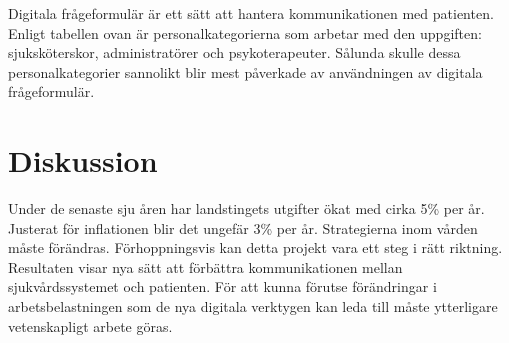 \documentclass[12pt,a4paper,oneside]{article}
\let\oldcite\cite
\renewcommand*\cite[1]{\textsuperscript{\oldcite{#1}}}
\begin{document}
\newpage
Digitala fr{\aa}geformul{\"a}r {\"a}r ett s{\"a}tt att hantera kommunikationen med patienten. Enligt tabellen ovan {\"a}r personalkategorierna som arbetar med den uppgiften: sjuksk{\"o}terskor, administrat{\"o}rer och psykoterapeuter. S{\aa}lunda skulle dessa personalkategorier sannolikt blir mest p{\aa}verkade av anv{\"a}ndningen av digitala fr{\aa}geformul{\"a}r.


\section*{Diskussion}
Under de senaste sju {\aa}ren har landstingets utgifter {\"o}kat med cirka 5\% per {\aa}r. Justerat f{\"o}r inflationen blir det ungef{\"a}r 3\% per {\aa}r\cite{numbers3.1, numbers3.2}. Strategierna inom v{\aa}rden m{\aa}ste f{\"o}r{\"a}ndras. F{\"o}rhoppningsvis kan detta projekt vara ett steg i r{\"a}tt riktning. Resultaten visar nya s{\"a}tt att f{\"o}rb{\"a}ttra kommunikationen mellan sjukv{\aa}rdssystemet och patienten.
F{\"o}r att kunna f{\"o}rutse f{\"o}r{\"a}ndringar i arbetsbelastningen som de nya digitala verktygen kan leda till m{\aa}ste ytterligare vetenskapligt arbete g{\"o}ras. %

\end{document}
